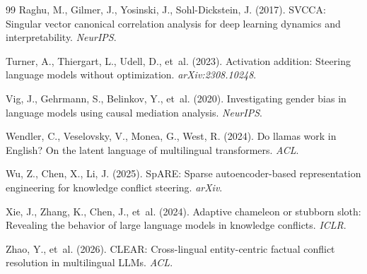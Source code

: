 \documentclass{article}
\begin{document}
\begin{thebibliography}{99}
Raghu, M., Gilmer, J., Yosinski, J., Sohl-Dickstein, J. (2017).
SVCCA: Singular vector canonical correlation analysis for deep learning dynamics and interpretability.
\emph{NeurIPS}.

Turner, A., Thiergart, L., Udell, D., et~al. (2023).
Activation addition: Steering language models without optimization.
\emph{arXiv:2308.10248}.

Vig, J., Gehrmann, S., Belinkov, Y., et~al. (2020).
Investigating gender bias in language models using causal mediation analysis.
\emph{NeurIPS}.

Wendler, C., Veselovsky, V., Monea, G., West, R. (2024).
Do llamas work in English? On the latent language of multilingual transformers.
\emph{ACL}.

Wu, Z., Chen, X., Li, J. (2025).
SpARE: Sparse autoencoder-based representation engineering for knowledge conflict steering.
\emph{arXiv}.

Xie, J., Zhang, K., Chen, J., et~al. (2024).
Adaptive chameleon or stubborn sloth: Revealing the behavior of large language models in knowledge conflicts.
\emph{ICLR}.

Zhao, Y., et~al. (2026).
CLEAR: Cross-lingual entity-centric factual conflict resolution in multilingual LLMs.
\emph{ACL}.

\end{thebibliography}
\end{document}
